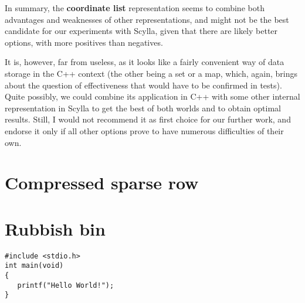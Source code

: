 \documentclass{article}
\begin{document}
In summary, the \textbf{coordinate list} representation seems to combine both advantages and weaknesses of other representations, and might not be the best candidate for our experiments with Scylla, given that there are likely better options, with more positives than negatives. 

It is, however, far from useless, as it looks like a fairly convenient way of data storage in the C++ context (the other being a set or a map, which, again, brings about the question of effectiveness that would have to be confirmed in tests). Quite possibly, we could combine its application in C++ with some other internal representation in Scylla to get the best of both worlds and to obtain optimal results. Still, I would not recommend it as first choice for our further work, and endorse it only if all other options prove to have numerous difficulties of their own.

\pagebreak
\section{Compressed sparse row}

\pagebreak
\section*{Rubbish bin}

\begin{lstlisting}[style=CStyle]
#include <stdio.h>
int main(void)
{
   printf("Hello World!"); 
}
\end{lstlisting}
\end{document}
